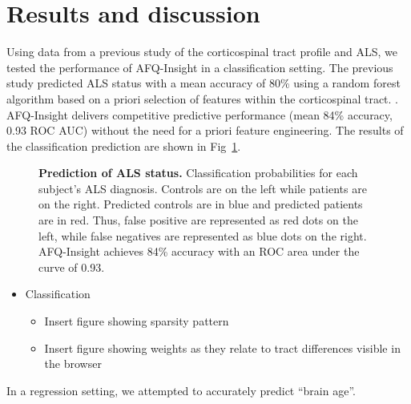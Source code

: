 \section*{Results and discussion}

Using data from a previous study of the corticospinal tract profile and ALS\cite{sarica2017corticospinal}, we tested the performance of AFQ-Insight in a classification setting. The previous study predicted ALS status with a mean accuracy of 80\% using a random forest algorithm based on a priori selection of features within the corticospinal tract. . AFQ-Insight delivers competitive predictive performance (mean 84\% accuracy, 0.93 ROC AUC) without the need for a priori feature engineering. The results of the classification prediction are shown in Fig~\ref{fig:class-results}.

\begin{figure}[!h]
    \centering
    \caption{{\bf Prediction of ALS status.}
        Classification probabilities for each subject's ALS diagnosis. Controls are on the left while patients are on the right. Predicted controls are in blue and predicted patients are in red. Thus, false positive are represented as red dots on the left, while false negatives are represented as blue dots on the right. AFQ-Insight achieves 84\% accuracy with an ROC area under the curve of 0.93.
    }
    \label{fig:class-results}
\end{figure}

\begin{itemize}
  \item Classification
    \begin{itemize}
      \item Insert figure showing sparsity pattern
      \item Insert figure showing weights as they relate to tract differences visible in the browser
    \end{itemize}
\end{itemize}

In a regression setting, we attempted to accurately predict ``brain age''.

